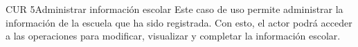 \begin{UseCase}{CUR 5}{Administrar información escolar}
	{
	    Este caso de uso permite administrar la información de la escuela que ha sido registrada. Con esto, el actor podrá acceder a las operaciones para modificar, visualizar y completar la información escolar.
	}


 			

\end{UseCase}

